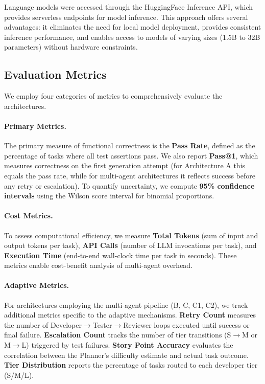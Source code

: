 Language models were accessed through the HuggingFace Inference API, which provides serverless endpoints for model inference. This approach offers several advantages: it eliminates the need for local model deployment, provides consistent inference performance, and enables access to models of varying sizes (1.5B to 32B parameters) without hardware constraints.

\subsection{Evaluation Metrics}
\label{subsec:metrics}

We employ four categories of metrics to comprehensively evaluate the architectures.

\paragraph{Primary Metrics.} The primary measure of functional correctness is the \textbf{Pass Rate}, defined as the percentage of tasks where all test assertions pass. We also report \textbf{Pass@1}, which measures correctness on the first generation attempt (for Architecture A this equals the pass rate, while for multi-agent architectures it reflects success before any retry or escalation). To quantify uncertainty, we compute \textbf{95\% confidence intervals} using the Wilson score interval for binomial proportions.

\paragraph{Cost Metrics.} To assess computational efficiency, we measure \textbf{Total Tokens} (sum of input and output tokens per task), \textbf{API Calls} (number of LLM invocations per task), and \textbf{Execution Time} (end-to-end wall-clock time per task in seconds). These metrics enable cost-benefit analysis of multi-agent overhead.

\paragraph{Adaptive Metrics.} For architectures employing the multi-agent pipeline (B, C, C1, C2), we track additional metrics specific to the adaptive mechanisms. \textbf{Retry Count} measures the number of Developer$\rightarrow$Tester$\rightarrow$Reviewer loops executed until success or final failure. \textbf{Escalation Count} tracks the number of tier transitions (S$\rightarrow$M or M$\rightarrow$L) triggered by test failures. \textbf{Story Point Accuracy} evaluates the correlation between the Planner's difficulty estimate and actual task outcome. \textbf{Tier Distribution} reports the percentage of tasks routed to each developer tier (S/M/L).

